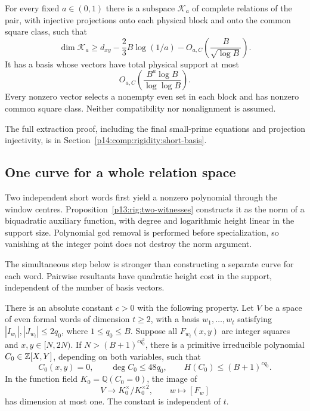 \begin{theorem}
\label{p13:rig:short-basis}
For every fixed $a\in(0,1)$ there is a subspace $\mathcal K_a$
of complete relations of the pair, with injective projections
onto each physical block and onto the common square class,
such that
\begin{equation}
 \dim\mathcal K_a\ge d_{xy}-\frac23B\log(1/a)
                    -O_{a,C}\!\left(\frac B{\sqrt{\log B}}\right).
 \label{p13:rig:short-dimension}
\end{equation}
It has a basis whose vectors have total physical support at most
\begin{equation}
                    O_{a,C}\!\left(
                         \frac{B^a\log B}{\log\log B}\right).
 \label{p13:rig:short-support}
\end{equation}
Every nonzero vector selects a nonempty even set in each block
and has nonzero common square class.  Neither compatibility nor
nonalignment is assumed.
\end{theorem}

The full extraction proof, including the final small-prime equations
and projection injectivity, is in
Section~\ref{p14:comp:rigidity:short-basis}.

\subsection{One curve for a whole relation space}

Two independent short words first yield a nonzero polynomial through
the window centres.  Proposition~\ref{p13:rig:two-witnesses} constructs
it as the norm of a biquadratic auxiliary function, with degree and
logarithmic height linear in the support size.  Polynomial gcd removal
is performed before specialization, so vanishing at the integer point
does not destroy the norm argument.

The simultaneous step below is stronger than constructing a separate
curve for each word.  Pairwise resultants have quadratic height cost
in the support, independent of the number of basis vectors.

\begin{theorem}
\label{p13:rig:common-curve}
There is an absolute constant $c>0$ with the following property.
Let $V$ be a space of even formal words of dimension $t\ge2$,
with a basis $w_1,\ldots,w_t$ satisfying
$|I_{w_i}|,|J_{w_i}|\le2q_0$, where $1\le q_0\le B$.
Suppose all $F_{w_i}(x,y)$ are integer squares and
$x,y\in[N,2N)$.  If $N>(B+1)^{cq_0^2}$, there is a
primitive irreducible polynomial $C_0\in\mathbb Z[X,Y]$, depending
on both variables, such that
\begin{equation}
 C_0(x,y)=0,\qquad \deg C_0\le48q_0,
 \qquad H(C_0)\le(B+1)^{cq_0}.
 \label{p13:rig:common-degree-height}
\end{equation}
In the function field $K_0=\mathbb Q(C_0=0)$, the image of
\[
               V\longrightarrow K_0^\times/K_0^{\times2},
                  \qquad w\longmapsto[F_w]
\]
has dimension at most one.  The constant is independent of $t$.
\end{theorem}


